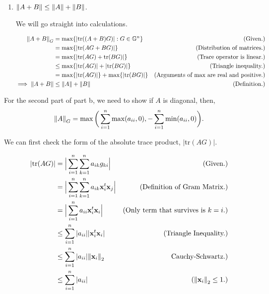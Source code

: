 \begin{solution}
\begin{enumerate}[(1)]
            \item $\norm{A + B} \leq \norm{A} + \norm{B}$.

            \jump
            We will go straight into calculations.

            \alignbreak
            \begin{align}
                \norm{A+B}_G &= \max \{ |\text{tr}((A+B)G)| : G \in \mathbb{G}^n \} &\text{(Given.)}\nonumber\\
                &= \max \{ |\text{tr}(AG + BG)|\} &\text{(Distribution of matrices.)}\nonumber\\
                &= \max \{ |\text{tr}(AG) + \text{tr}(BG)|\} &\text{(Trace operator is linear.)}\nonumber\\
                &\leq \max \{ |\text{tr}(AG)| + |\text{tr}(BG)|\} &\text{(Triangle inequality.)}\nonumber\\
                &= \max \{ |\text{tr}(AG)|\} + \max \{|\text{tr}(BG)|\} &\text{(Arguments of max are real and positive.)}\nonumber\\
                \implies \norm{A + B} &\leq \norm{A} + \norm{B} &\text{(Definition.)}\nonumber
            \end{align}
           \alignbreak
    \end{enumerate}

    \newpage
    For the second part of part b, we need to show if $A$ is diagonal, then,
\[
\norm{A}_G = \max\bigg( \sum_{i = 1}^n \max (a_{ii}, 0), -\sum_{i = 1}^n \min (a_{ii}, 0)\bigg).
\]


We can first check the form of the absolute trace product, $|$tr$(AG)|$.
    
    \alignbreak
    \begin{align}
        |\text{tr}(AG)| &= \Big| \sum_{i = 1}^n\sum_{k = 1}^na_{ik}g_{ki} \Big| &\text{(Given.)}\nonumber\\
        &= \Big| \sum_{i = 1}^n\sum_{k = 1}^na_{ik}\textbf{x}^t_i\textbf{x}_j \Big| &\text{(Definition of Gram Matrix.)}\nonumber\\
        &= \Big| \sum_{i = 1}^na_{ii}\textbf{x}^t_i\textbf{x}_i \Big| &\text{(Only term that survives is $k = i$.)}\nonumber\\
        &\leq \sum_{i = 1}^n|a_{ii}||\textbf{x}^t_i\textbf{x}_i| &\text{(Triangle Inequality.)}\nonumber\\
        &\leq \sum_{i = 1}^n|a_{ii}| \norm{\textbf{x}_i}_2 &\text{Cauchy-Schwartz.)}\nonumber\\
        &\leq \sum_{i = 1}^n|a_{ii}| &(\norm{\textbf{x}_i}_2 \leq 1.)\label{p1b: trag}
    \end{align}
    \alignbreak


\end{solution}
